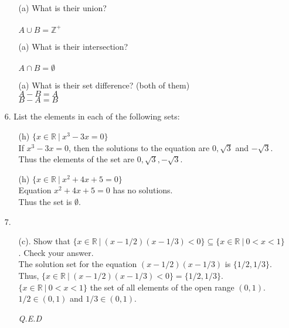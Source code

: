 \documentclass[12pt, a4paper]{article}                  %
\begin{document}
\begin{enumerate}
\begin{enumerate}
\item[(a)]
What is their union?\\
\\
$A \cup B = \mathbb{Z}^+$
\\
\item[(a)]
What is their intersection?\\
\\
$A \cap B = \emptyset$
\\
\item[(a)]
What is their set difference? (both of them)\\

$A - B = A$\\
$B - A = B$
\end{enumerate}

\item[6.]
List the elements in each of the following sets:
\begin{enumerate}
\item[(h)]
$\{x \in \mathbb{R} \ \vert \ x^3 - 3x = 0\}$\\

If $x^3 - 3x = 0$, then the solutions to the equation
are $0,\sqrt{3}$ and $-\sqrt{3}$.\\
Thus the elements of the set are $0,\sqrt{3},-\sqrt{3}$.
\\
\item[(h)]
$\{x \in \mathbb{R} \ \vert \ x^2 + 4x + 5 = 0\}$\\

Equation $x^2 + 4x + 5 = 0$ has no solutions.\\
Thus the set is $\emptyset$.
\\
\end{enumerate}

\item[7.]
\begin{enumerate}
\item[(c).]
Show that $\{x \in \mathbb{R} \ \vert \ (x-1/2)(x-1/3)<0\} \subseteq \{x \in \mathbb{R} \ \vert \ 0 < x < 1\}$.
Check your answer.\\

The solution set for the equation $(x-1/2)(x-1/3)$ is $\{1/2,1/3\}$. Thus, $\{x \in \mathbb{R} \ \vert \ (x-1/2)(x-1/3)<0\} = \{1/2,1/3\}$.
$\{x \in \mathbb{R} \ \vert \ 0 < x < 1\}$ the set of all elements of the open range $(0,1)$.
$1/2 \in (0,1)$ and $1/3 \in (0,1)$.
\begin{flushright}
\textit{Q.E.D}
\end{flushright}
\end{enumerate}


\end{enumerate}
\end{document}
